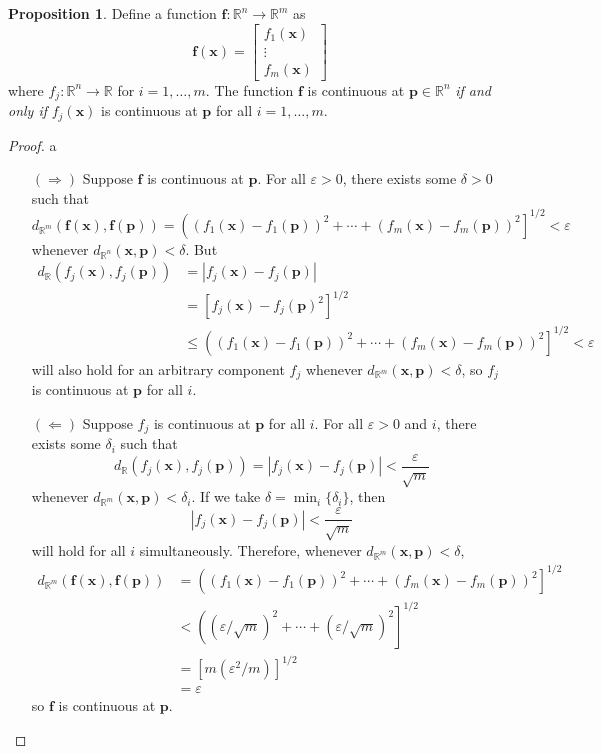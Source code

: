 \documentclass{article}
\newcommand{\R}{\mathbb{R}}
\newcommand{\x}{\mathbf{x}}
\newcommand{\f}{\mathbf{f}}
\theoremstyle{definition}
\newtheorem{proposition}{Proposition}[section]
\begin{document}
	\begin{proposition}
		Define a function $ \f:\R^n\to\R^m $ as 
		$$\f(\x)=\begin{bmatrix}
			f_1(\x)\\\vdots \\ f_m(\x)
		\end{bmatrix} $$ where $ f_j:\R^n\to\R $ for $ i=1,\ldots,m $. The function $ \f $ is continuous at $ \mathbf p \in \R^n$ \textit{if and only if} $ f_j(\x) $ is continuous at $ \mathbf p $ for all $ i=1,\ldots,m $. 
	\end{proposition}
	\begin{proof}{\color{white}a}
		\begin{enumerate}
			\item [$(\Longrightarrow)$] Suppose $ \f $ is continuous at $ \mathbf p $. For all $ \varepsilon>0 $, there exists some $ \delta > 0 $ such that $$ d_{\R^m}(\f(\x),\f(\mathbf p)) = \left((f_1(\x) - f_1(\mathbf p))^2 + \cdots + (f_m(\x) - f_m(\mathbf p))^2\right]^{1/2}< \varepsilon$$ whenever $ d_{\R^n}(\x,\mathbf{p})<\delta $. But
			\begin{align*}
				d_{\R}(f_j(\x), f_j(\mathbf p))&=|f_j(\x)-f_j(\mathbf p)|\\& = [f_j(\x)-f_j(\mathbf p)^2]^{1/2}\\ &	\le \left((f_1(\x) - f_1(\mathbf p))^2 + \cdots + (f_m(\x) - f_m(\mathbf p))^2\right]^{1/2}< \varepsilon
			\end{align*}
			will also hold for an arbitrary component  $ f_j $ whenever $ d_{\R^m}(\x,\mathbf{p})<\delta $, so $ f_j $ is continuous at $ \mathbf p $ for all $ i $. 
			\item [$(\Longleftarrow)$] Suppose $ f_j $ is continuous at $ \mathbf p $ for all $ i $. For all $ \varepsilon > 0 $ and $ i $, there exists some $ \delta_i  $ such that $$ d_\R(f_j(\x), f_j(\mathbf p)) = |f_j(\x)-f_j(\mathbf p)| < \frac{\varepsilon}{\sqrt{m}} $$ whenever $ d_{\R^m}(\x,\mathbf p)<\delta_i $. If we take $ \delta = \min_i\{\delta_i\} $, then $$|f_j(\x)-f_j(\mathbf p) | < \frac{\varepsilon}{\sqrt m}$$ will hold for all $ i $ simultaneously. Therefore, whenever $ d_{\R^m}(\x,\mathbf{p}) < \delta $, \begin{align*}
				d_{\R^m}(\f(\x),\f(\mathbf p)) & = \left((f_1(\x) - f_1(\mathbf p))^2 + \cdots + (f_m(\x) - f_m(\mathbf p))^2\right]^{1/2} \\ & < \left((\varepsilon/\sqrt{m})^2 + \cdots + (\varepsilon/\sqrt{m})^2\right]^{1/2} \\
				& = [m(\varepsilon^2/m)]^{1/2} \\
				& = \varepsilon
			\end{align*}
			so $ \f $ is continuous at $ \mathbf p $.
		\end{enumerate}
		
	\end{proof}
	
\end{document}
